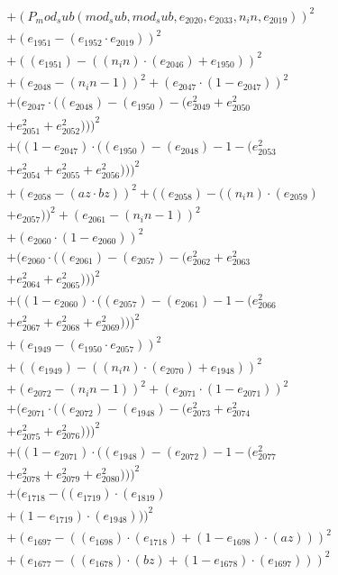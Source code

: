 \documentclass[10pt, a4paper]{article}
\begin{document}
\begin{align*}
& + (P_mod_sub(mod_sub, mod_sub, e_{2020}, e_{2033}, n_in, e_{2019}))^{2} \\
& + (e_{1951} - (e_{1952}  \cdot  e_{2019}))^{2} \\
& + ((e_{1951}) - ((n_in)  \cdot  (e_{2046}) + e_{1950}))^{2} \\
& + (e_{2048} - (n_in - 1))^{2} + (e_{2047}  \cdot  (1 - e_{2047}))^{2} \\
& + (e_{2047}  \cdot  ((e_{2048}) - (e_{1950}) - (e_{2049}^{2} + e_{2050}^{2} \\
& + e_{2051}^{2} + e_{2052}^{2})))^{2} \\
& + ((1 - e_{2047})  \cdot  ((e_{1950}) - (e_{2048}) - 1 - (e_{2053}^{2} \\
& + e_{2054}^{2} + e_{2055}^{2} + e_{2056}^{2})))^{2} \\
& + (e_{2058} - (az  \cdot  bz))^{2} + ((e_{2058}) - ((n_in)  \cdot  (e_{2059}) \\
& + e_{2057}))^{2} + (e_{2061} - (n_in - 1))^{2} \\
& + (e_{2060}  \cdot  (1 - e_{2060}))^{2} \\
& + (e_{2060}  \cdot  ((e_{2061}) - (e_{2057}) - (e_{2062}^{2} + e_{2063}^{2} \\
& + e_{2064}^{2} + e_{2065}^{2})))^{2} \\
& + ((1 - e_{2060})  \cdot  ((e_{2057}) - (e_{2061}) - 1 - (e_{2066}^{2} \\
& + e_{2067}^{2} + e_{2068}^{2} + e_{2069}^{2})))^{2} \\
& + (e_{1949} - (e_{1950}  \cdot  e_{2057}))^{2} \\
& + ((e_{1949}) - ((n_in)  \cdot  (e_{2070}) + e_{1948}))^{2} \\
& + (e_{2072} - (n_in - 1))^{2} + (e_{2071}  \cdot  (1 - e_{2071}))^{2} \\
& + (e_{2071}  \cdot  ((e_{2072}) - (e_{1948}) - (e_{2073}^{2} + e_{2074}^{2} \\
& + e_{2075}^{2} + e_{2076}^{2})))^{2} \\
& + ((1 - e_{2071})  \cdot  ((e_{1948}) - (e_{2072}) - 1 - (e_{2077}^{2} \\
& + e_{2078}^{2} + e_{2079}^{2} + e_{2080}^{2})))^{2} \\
& + (e_{1718} - ((e_{1719})  \cdot  (e_{1819}) \\
& + (1 - e_{1719})  \cdot  (e_{1948})))^{2} \\
& + (e_{1697} - ((e_{1698})  \cdot  (e_{1718}) + (1 - e_{1698})  \cdot  (az)))^{2} \\
& + (e_{1677} - ((e_{1678})  \cdot  (bz) + (1 - e_{1678})  \cdot  (e_{1697})))^{2} \\

\end{align*}
\end{document}
